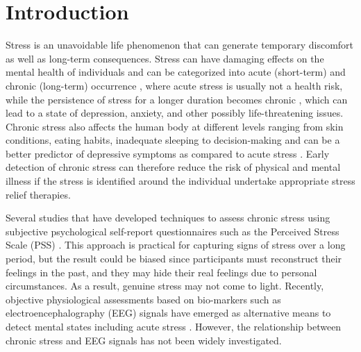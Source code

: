\documentclass[pdflatex,sn-mathphys]{sn-jnl}%
\theoremstyle{thmstyleone}%
\theoremstyle{thmstyletwo}%
\theoremstyle{thmstylethree}%
\begin{document}


\maketitle
\section{Introduction} \label{sec1}
Stress is an unavoidable life phenomenon that can generate temporary discomfort as well as long-term consequences. Stress can have damaging effects on the mental health of individuals and can be categorized into acute (short-term) and chronic (long-term) occurrence \cite{Khosrowabadi-2011}, where acute stress is usually not a health risk, while the persistence of stress for a longer duration becomes chronic \cite{Khosrowabadi-2011}, which can lead to a state of depression, anxiety, and other possibly life-threatening issues. Chronic stress also affects the human body at different levels ranging from skin conditions, eating habits, inadequate sleeping to decision-making \cite{Thoits2010, Garg2001, Adam2007} and can be a better predictor of depressive symptoms as compared to acute stress \cite{McGonagle1990}. Early detection of chronic stress can therefore reduce the risk of physical and mental illness if the stress is identified around the individual undertake appropriate stress relief therapies. 

Several studies that have developed techniques to assess chronic stress using subjective psychological self-report questionnaires such as the Perceived Stress Scale (PSS) \cite{Cohen-1983}. This approach is practical for capturing signs of stress over a long period, but the result could be biased since participants must reconstruct their feelings in the past, and they may hide their real feelings due to personal circumstances. As a result, genuine stress may not come to light. Recently, objective physiological assessments based on bio-markers such as electroencephalography (EEG) signals have emerged as alternative means to detect mental states including acute stress \cite{Awang2011, Hu2015}. However, the relationship between chronic stress and EEG signals has not been widely investigated.
\end{document}

